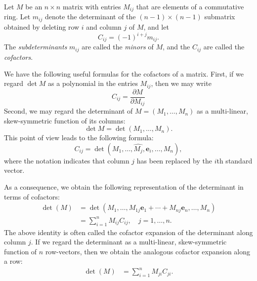 \documentclass[12pt]{article}
\newcommand{\be}{\mathbf{e}}
\begin{document}
Let $M$ be an $n\times n$ matrix with entries $M_{ij}$ that are
elements of a commutative ring.
Let $m_{ij}$ denote the
determinant of the $(n-1)\times(n-1)$ submatrix obtained by deleting
row $i$ and column  
$j$ of $M$, and let
$$C_{ij} = (-1)^{i+j} m_{ij}.$$
The \emph{subdeterminants} $m_{ij}$ are called  the \emph{minors} of $M$, and the 
$C_{ij}$ are called the \emph{cofactors}.   

We have the following useful formulas for the cofactors of a matrix.
First, if we regard $\det M$ as a polynomial in the entries $M_{ij}$, then we may write
\begin{equation}
  C_{ij} = \frac{\partial M}{\partial M_{ij}}
\end{equation}
Second, we may regard the determinant of $M=(M_1,\ldots,  M_n)$ as a multi-linear, skew-symmetric function of its columns:
\[  \det M = \det(M_1,\ldots, M_n).\]
This point of view leads to the following formula:
\begin{equation}
C_{ij} = \det(M_1,\ldots, \hat{M_j}, \be_i,\ldots, M_n),
\end{equation}
where the notation indicates that column $j$ has been replaced by the $i$th standard vector.

As a consequence, we obtain the following representation of the determinant in terms of
cofactors:
\begin{align*}
   \det(M) &= \det(M_1,\ldots, M_{1j} \be_1 + \cdots + M_{nj} \be_n , \ldots , M_n)\\
  &= \sum_{i=1}^n  M_{ij} C_{ij},\quad j=1,\ldots, n.
\end{align*}
The above identity is often called the cofactor expansion of the determinant along column $j$.  
If we regard the determinant as a multi-linear, skew-symmetric function of $n$ row-vectors, then we obtain the
analogous cofactor expansion along a row:
\begin{align*}
\det(M) &= \sum_{i=1}^n M_{ji} C_{ji}.
\end{align*}
\end{document}
